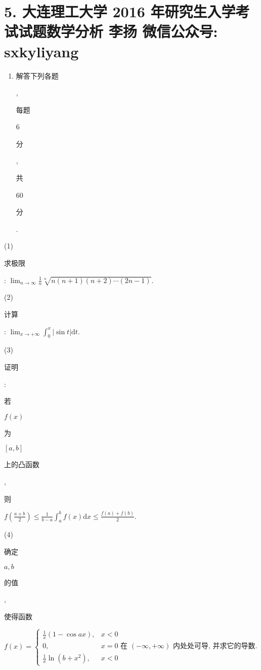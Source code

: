 \documentclass[10pt]{article}
\begin{document}
\section{5. 大连理工大学 2016 年研究生入学考试试题数学分析 
 李扬 
 微信公众号: sxkyliyang}
\begin{enumerate}
  \item \begin{CJK}{UTF8}{mj}解答下列各题\end{CJK}, \begin{CJK}{UTF8}{mj}每题\end{CJK} 6 \begin{CJK}{UTF8}{mj}分\end{CJK}, \begin{CJK}{UTF8}{mj}共\end{CJK} 60 \begin{CJK}{UTF8}{mj}分\end{CJK}.
\end{enumerate}
(1) \begin{CJK}{UTF8}{mj}求极限\end{CJK}: $\lim _{n \rightarrow \infty} \frac{1}{n} \sqrt[n]{n(n+1)(n+2) \cdots(2 n-1)}$.

(2) \begin{CJK}{UTF8}{mj}计算\end{CJK}: $\lim _{x \rightarrow+\infty} \int_{0}^{x}|\sin t| \mathrm{d} t$.

(3) \begin{CJK}{UTF8}{mj}证明\end{CJK}: \begin{CJK}{UTF8}{mj}若\end{CJK} $f(x)$ \begin{CJK}{UTF8}{mj}为\end{CJK} $[a, b]$ \begin{CJK}{UTF8}{mj}上的凸函数\end{CJK}, \begin{CJK}{UTF8}{mj}则\end{CJK} $f\left(\frac{a+b}{2}\right) \leqslant \frac{1}{b-a} \int_{a}^{b} f(x) \mathrm{d} x \leqslant \frac{f(a)+f(b)}{2}$.

(4) \begin{CJK}{UTF8}{mj}确定\end{CJK} $a, b$ \begin{CJK}{UTF8}{mj}的值\end{CJK}, \begin{CJK}{UTF8}{mj}使得函数\end{CJK} $f(x)= \begin{cases}\frac{1}{x}(1-\cos a x), & x<0 \\ 0, & x=0 \text { 在 }(-\infty,+\infty) \text { 内处处可导, 并求它的导数. } \\ \frac{1}{x} \ln \left(b+x^{2}\right), & x<0\end{cases}$
\end{document}
